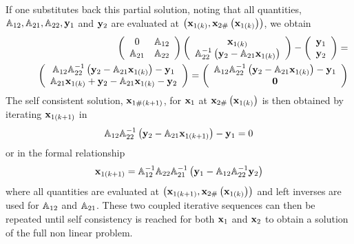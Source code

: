 If one substitutes back this partial solution, noting that all quantities, $%
{\Bbb A}_{12},{\Bbb A}_{21},{\Bbb A}_{22},{\bf y}_{1}$ and ${\bf y}_{2}$ are
evaluated at $\left( {\bf x}_{1\left( k\right) },{\bf x}_{2\#}\left( {\bf x}%
_{1\left( k\right) }\right) \right) $, we obtain 
\begin{eqnarray}
&&\left( 
\begin{array}{cc}
0 & {\Bbb A}_{12} \\ 
{\Bbb A}_{21} & {\Bbb A}_{22}%
\end{array}%
\right) \left( 
\begin{array}{c}
{\bf x}_{1\left( k\right) } \\ 
{\Bbb A}_{22}^{-1}\left( {\bf y}_{2}-{\Bbb A}_{21}{\bf x}_{1\left( k\right)
}\right)%
\end{array}%
\right) -\left( 
\begin{array}{c}
{\bf y}_{1} \\ 
{\bf y}_{2}%
\end{array}%
\right) =  \nonumber \\
&&\qquad \left( 
\begin{array}{c}
{\Bbb A}_{12}{\Bbb A}_{22}^{-1}\left( {\bf y}_{2}-{\Bbb A}_{21}{\bf x}%
_{1\left( k\right) }\right) -{\bf y}_{1} \\ 
{\Bbb A}_{21}{\bf x}_{1\left( k\right) }+{\bf y}_{2}-{\Bbb A}_{21}{\bf x}%
_{1\left( k\right) }-{\bf y}_{2}%
\end{array}%
\right) =\left( 
\begin{array}{c}
{\Bbb A}_{12}{\Bbb A}_{22}^{-1}\left( {\bf y}_{2}-{\Bbb A}_{21}{\bf x}%
_{1\left( k\right) }\right) -{\bf y}_{1} \\ 
{\bf 0}%
\end{array}%
\right)  \label{baksub}
\end{eqnarray}%
The self consistent solution, ${\bf x}_{1\#\left( k+1\right) }$, for ${\bf x}%
_{1}$ at ${\bf x}_{2\#}\left( {\bf x}_{1\left( k\right) }\right) $ is then
obtained by iterating ${\bf x}_{1\left( k+1\right) }$ in%
\begin{equation}
{\Bbb A}_{12}{\Bbb A}_{22}^{-1}\left( {\bf y}_{2}-{\Bbb A}_{21}{\bf x}%
_{1\left( k+1\right) }\right) -{\bf y}_{1}=0
\end{equation}%
or in the formal relationship 
\begin{equation}
{\bf x}_{1\left( k+1\right) }={\Bbb A}_{12}^{-1}{\Bbb A}_{22}{\Bbb A}%
_{21}^{-1}\left( {\bf y}_{1}-{\Bbb A}_{12}{\Bbb A}_{22}^{-1}{\bf y}%
_{2}\right)  \label{x1kplus1}
\end{equation}%
where all quantities are evaluated at $\left( {\bf x}_{1\left( k+1\right) },%
{\bf x}_{2\#}\left( {\bf x}_{1\left( k\right) }\right) \right) $ and left
inverses are used for ${\Bbb A}_{12}$ and ${\Bbb A}_{21}$. These two coupled
iterative sequences can then be repeated until self consistency is reached
for both ${\bf x}_{1}$ and ${\bf x}_{2}$ to obtain a solution of the full
non linear problem.

